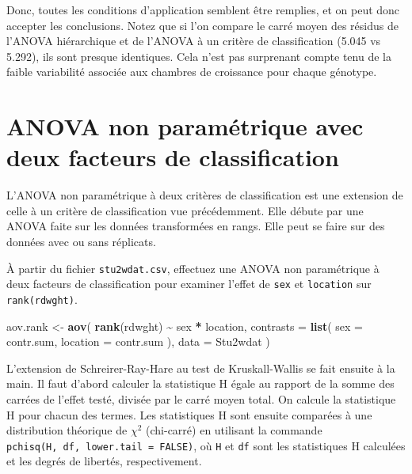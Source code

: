 \documentclass[
  12pt,
]{book}
\newenvironment{Shaded}{\begin{snugshade}}{\end{snugshade}}
\newcommand{\DataTypeTok}[1]{\textcolor[rgb]{0.13,0.29,0.53}{#1}}
\newcommand{\KeywordTok}[1]{\textcolor[rgb]{0.13,0.29,0.53}{\textbf{#1}}}
\newcommand{\NormalTok}[1]{#1}
\newcommand{\OperatorTok}[1]{\textcolor[rgb]{0.81,0.36,0.00}{\textbf{#1}}}
\newcommand{\StringTok}[1]{\textcolor[rgb]{0.31,0.60,0.02}{#1}}
\begin{document}
Donc, toutes les conditions d'application semblent être remplies, et on peut donc accepter les conclusions. Notez que si l'on compare le carré moyen des résidus de l'ANOVA hiérarchique et de l'ANOVA à un critère de classification (5.045 vs 5.292), ils sont presque identiques. Cela n'est pas surprenant compte tenu de la faible variabilité associée aux chambres de croissance pour chaque génotype.

\hypertarget{anova-non-paramuxe9trique-avec-deux-facteurs-de-classification}{%
\section{ANOVA non paramétrique avec deux facteurs de classification}\label{anova-non-paramuxe9trique-avec-deux-facteurs-de-classification}}

L'ANOVA non paramétrique à deux critères de classification est une extension de celle à un critère de classification vue précédemment. Elle débute par une ANOVA faite sur les données transformées en rangs. Elle peut se faire sur des données avec ou sans réplicats.

À partir du fichier \texttt{stu2wdat.csv}, effectuez une ANOVA non paramétrique à deux facteurs de classification pour examiner l'effet de \texttt{sex} et \texttt{location} sur \texttt{rank(rdwght)}.

\begin{Shaded}
\begin{Highlighting}[]
\NormalTok{aov.rank \textless{}{-}}\StringTok{ }\KeywordTok{aov}\NormalTok{(}
  \KeywordTok{rank}\NormalTok{(rdwght) }\OperatorTok{\textasciitilde{}}\StringTok{ }\NormalTok{sex }\OperatorTok{*}\StringTok{ }\NormalTok{location,}
  \DataTypeTok{contrasts =} \KeywordTok{list}\NormalTok{(}
    \DataTypeTok{sex =}\NormalTok{ contr.sum, }\DataTypeTok{location =}\NormalTok{ contr.sum}
\NormalTok{  ),}
  \DataTypeTok{data =}\NormalTok{ Stu2wdat}
\NormalTok{)}
\end{Highlighting}
\end{Shaded}

L'extension de Schreirer-Ray-Hare au test de Kruskall-Wallis se fait ensuite à la main. Il faut d'abord calculer la statistique H égale au rapport de la somme des carrées de l'effet testé, divisée par le carré moyen total. On calcule la statistique H pour chacun des termes. Les statistiques H sont ensuite comparées à une distribution théorique de \(\chi^2\) (chi-carré) en utilisant la commande \texttt{pchisq(H,\ df,\ lower.tail\ =\ FALSE)}, où \texttt{H} et \texttt{df} sont les statistiques H calculées et les degrés de libertés, respectivement.
\end{document}
